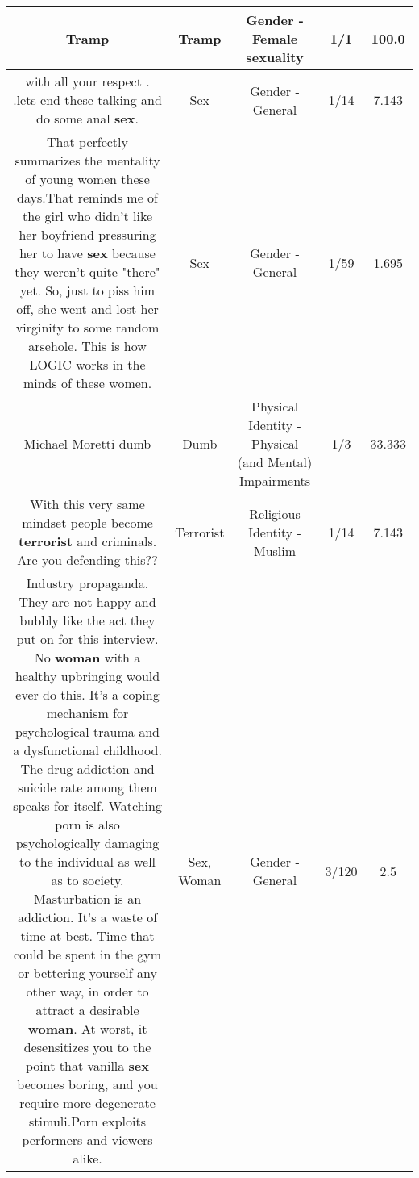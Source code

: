 \documentclass[11pt]{article}
\newlength\mylength
\begin{document}
\begin{center}
\begin{longtable}{|C{.65\mylength}|C{.30\mylength}|C{.12\mylength}|C{.12\mylength}|C{.12\mylength}|}
  \small Tramp\normalsize   & Tramp & Gender - Female sexuality & 1/1 & 100.0 \\  \hline
  \small with all your respect . .lets end these talking and do some anal \textbf{sex}.\normalsize   & Sex & Gender - General & 1/14 & 7.143 \\  \hline
  \small That perfectly summarizes the mentality of young women these days.That reminds me of the girl who didn't like her boyfriend pressuring her to have \textbf{sex} because they weren't quite "there" yet. So, just to piss him off, she went and lost her virginity to some random arsehole. This is how LOGIC works in the minds of these women.\normalsize   & Sex & Gender - General & 1/59 & 1.695 \\  \hline
  \small Michael Moretti dumb\normalsize   & Dumb & Physical Identity - Physical (and Mental) Impairments & 1/3 & 33.333 \\  \hline
  \small With this very same mindset people become \textbf{terrorist} and criminals. Are you defending this??\normalsize   & Terrorist & Religious Identity - Muslim & 1/14 & 7.143 \\  \hline
  \small Industry propaganda. They are not happy and bubbly like the act they put on for this interview. No \textbf{woman} with a healthy upbringing would ever do this. It's a coping mechanism for psychological trauma and a dysfunctional childhood. The drug addiction and suicide rate among them speaks for itself. Watching porn is also psychologically damaging to the individual as well as to society. Masturbation is an addiction. It's a waste of time at best. Time that could be spent in the gym or bettering yourself any other way, in order to attract a desirable \textbf{woman}. At worst, it desensitizes you to the point that vanilla \textbf{sex} becomes boring, and you require more degenerate stimuli.Porn exploits performers and viewers alike.\normalsize   & Sex, Woman & Gender - General & 3/120 & 2.5 \\  \hline

\end{longtable}
\end{center}
\end{document}

